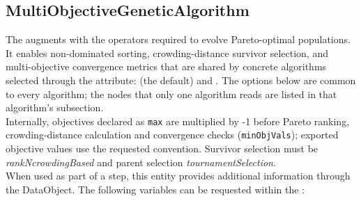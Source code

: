 \subsection{MultiObjectiveGeneticAlgorithm}
  The  augments  with the
  operators required to evolve Pareto-optimal populations. It enables non-dominated sorting,
  crowding-distance survivor selection, and multi-objective convergence metrics that are shared
  by concrete algorithms selected through the  attribute: 
  (the default) and . The options below are common to every algorithm; the
  nodes that only one algorithm reads are listed in that algorithm's subsection.\\
  Internally, objectives declared as \texttt{max} are multiplied by -1 before Pareto ranking,
  crowding-distance                             calculation and convergence checks
  (\texttt{minObjVals}); exported objective values use the requested convention.
  Survivor selection must be \textit{rankNcrowdingBased} and parent selection
  \textit{tournamentSelection}.
\vspace{7pt} \\When used as part of a  step, this entity provides
        additional information through the  DataObject. The
        following variables can be requested within the :

